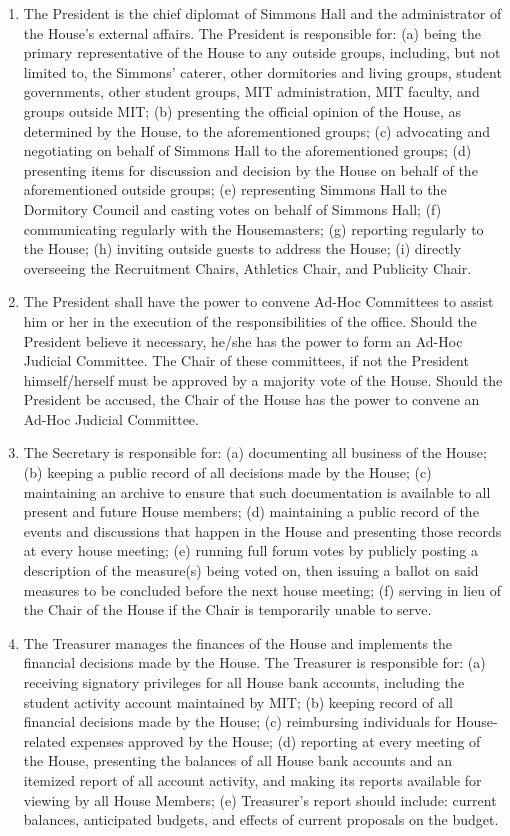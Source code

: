 \documentclass[letterpaper]{article}
\begin{document}
\begin{enumerate}
\begin{enumerate}
\begin{enumerate}
\item The President is the chief diplomat of Simmons Hall and the administrator of the House's external affairs. The President is responsible for: (a) being the primary representative of the House to any outside groups, including, but not limited to, the Simmons' caterer, other dormitories and living groups, student governments, other student groups, MIT administration, MIT faculty, and groups outside MIT; (b) presenting the official opinion of the House, as determined by the House, to the aforementioned groups; (c) advocating and negotiating on behalf of Simmons Hall to the aforementioned groups; (d) presenting items for discussion and decision by the House on behalf of the aforementioned outside groups; (e) representing Simmons Hall to the Dormitory Council and casting votes on behalf of Simmons Hall; (f) communicating regularly with the Housemasters; (g) reporting regularly to the House; (h) inviting outside guests to address the House; (i) directly overseeing the Recruitment Chairs, Athletics Chair, and Publicity Chair.

\item The President shall have the power to convene Ad-Hoc Committees to assist him or her in the execution of the responsibilities of the office. Should the President believe it necessary, he/she has the power to form an Ad-Hoc Judicial Committee. The Chair of these committees, if not the President himself/herself must be approved by a majority vote of the House. Should the President be accused, the Chair of the House has the power to convene an Ad-Hoc Judicial Committee.

\item The Secretary is responsible for: (a) documenting all business of the House; (b) keeping a public record of all decisions made by the House; (c) maintaining an archive to ensure that such documentation is available to all present and future House members; (d) maintaining a public record of the events and discussions that happen in the House and presenting those records at every house meeting; (e) running full forum votes by publicly posting a description of the measure(s) being voted on, then issuing a ballot on said measures to be concluded before the next house meeting; (f) serving in lieu of the Chair of the House if the Chair is temporarily unable to serve.

\item The Treasurer manages the finances of the House and implements the financial decisions made by the House. The Treasurer is responsible for: (a) receiving signatory privileges for all House bank accounts, including the student activity account maintained by MIT; (b) keeping record of all financial decisions made by the House; (c) reimbursing individuals for House-related expenses approved by the House; (d) reporting at every meeting of the House, presenting the balances of all
House bank accounts and an itemized report of all account activity, and making its reports available for viewing by all House Members; (e) Treasurer's report should include: current balances, anticipated budgets, and effects of current proposals on the budget.


\end{enumerate}
\end{enumerate}
\end{enumerate}
\end{document}
